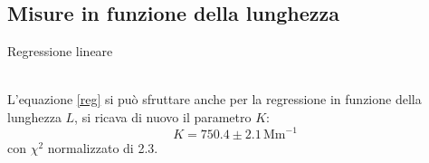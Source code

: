 \documentclass[letterpaper,11pt]{article}
\begin{document}
\begin{body}
\subsection{Misure in funzione della lunghezza}
\begin{figurehere}
\centering
{}
\caption{Regressione lineare}
\end{figurehere}\leavevmode
\\
L'equazione \eqref{reg} si può sfruttare anche per la regressione in funzione della lunghezza $L$, 
si ricava di nuovo il parametro $K$:
\[K = 750.4 \pm 2.1 \, \text{Mm}^{-1}\]
con $\chi^2$ normalizzato di 2.3.




\end{body}
\end{document}
